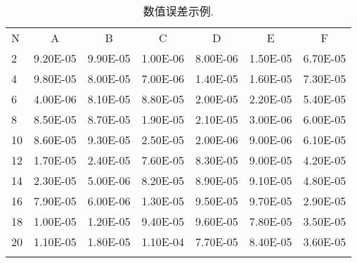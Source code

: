 \documentclass[master]{shnuthesis}
\begin{document}
\begin{table}[htp!]
\centering
\renewcommand\arraystretch{1.2} %
\caption{数值误差示例.}
\label{tab:error2}
\begin{tabularx}{0.9\textwidth}{||P{1cm}|C|C|C|C|C|C||}
\Xhline{2\arrayrulewidth}
N  & A       & B    & C       & D      & E       & F   \\
\Xhline{2\arrayrulewidth}
2  & 9.20E-05 & 9.90E-05 & 1.00E-06 & 8.00E-06 & 1.50E-05 & 6.70E-05 \\
4  & 9.80E-05 & 8.00E-05 & 7.00E-06 & 1.40E-05 & 1.60E-05 & 7.30E-05 \\
6  & 4.00E-06 & 8.10E-05 & 8.80E-05 & 2.00E-05 & 2.20E-05 & 5.40E-05 \\
8  & 8.50E-05 & 8.70E-05 & 1.90E-05 & 2.10E-05 & 3.00E-06 & 6.00E-05 \\
10 & 8.60E-05 & 9.30E-05 & 2.50E-05 & 2.00E-06 & 9.00E-06 & 6.10E-05 \\
12 & 1.70E-05 & 2.40E-05 & 7.60E-05 & 8.30E-05 & 9.00E-05 & 4.20E-05 \\
14 & 2.30E-05 & 5.00E-06 & 8.20E-05 & 8.90E-05 & 9.10E-05 & 4.80E-05 \\
16 & 7.90E-05 & 6.00E-06 & 1.30E-05 & 9.50E-05 & 9.70E-05 & 2.90E-05 \\
18 & 1.00E-05 & 1.20E-05 & 9.40E-05 & 9.60E-05 & 7.80E-05 & 3.50E-05 \\
20 & 1.10E-05 & 1.80E-05 & 1.10E-04   & 7.70E-05 & 8.40E-05 & 3.60E-05  \\
\Xhline{2\arrayrulewidth}
\end{tabularx}
\end{table}





\backmatter  %





%




\end{document}
